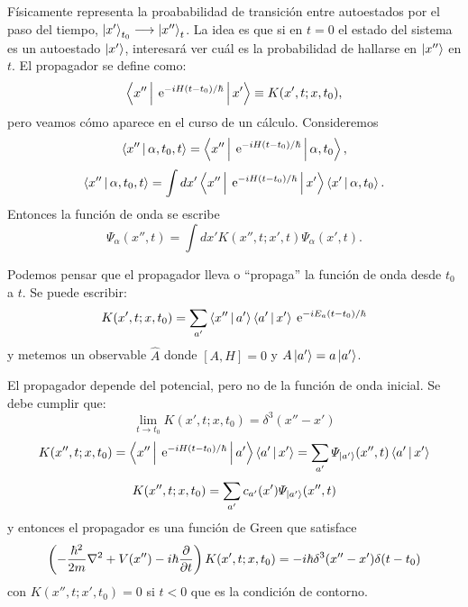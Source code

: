 \documentclass[10pt,oneside]{CBFT_book}
\begin{document}
Físicamente representa la proababilidad de transición entre autoestados por el paso del tiempo,
$ \Ket{x'}_{t_0} \longrightarrow \Ket{x''}_t$.
La idea es que si en $t=0$ el estado del sistema es un autoestado $\Ket{x'}$, interesará ver cuál
es la probabilidad de hallarse en $\Ket{x''}$ en $t$.
El propagador se define como:
\[
	\Braket{x''|\:\mathrm{e}^{-iH(t-t_0)/\hbar}|x'} \equiv K(x',t; x, t_0),
\]
pero veamos cómo aparece en el curso de un cálculo.
Consideremos
\[
	\Braket{x''| \alpha,t_0,t} = 
	\Braket{x''|\:\mathrm{e}^{-iH(t-t_0)/\hbar}|\alpha,t_0},
\]
\[
	\Braket{x''| \alpha,t_0,t} = 
	\int dx' \Braket{x''|\:\mathrm{e}^{-iH(t-t_0)/\hbar}|x'}\Braket{x'|\alpha,t_0}.
\]
Entonces la función de onda se escribe
\[
	\Psi_{\alpha}(x'',t) = \int dx' K(x'',t; x',t) \Psi_{\alpha}(x',t).
\]

Podemos pensar que el propagador lleva o ``propaga'' la función de onda desde $t_0$ a $t$. 
Se puede escribir:
\[
	K(x',t; x, t_0) = \sum_{a'} \Braket{x''|a'} \Braket{a'|x'} \:\mathrm{e}^{-iE_a(t-t_0)/\hbar}
\]
y metemos un observable $\hat{A}$ donde $[A,H]=0$ y $A\Ket{a'}=a\Ket{a'}$.

El propagador depende del potencial, pero no de la función de onda inicial. Se debe cumplir que:
\[
	\lim_{t\to t_0} K(x',t; x, t_0) = \delta^3(x''-x')
\]
\[
	K(x'',t; x, t_0) = \Braket{x''|\:\mathrm{e}^{-iH(t-t_0)/\hbar}|a'} \Braket{a'|x'} =
		\sum_{a'} \Psi_{\Ket{a'}}(x'',t)\Braket{a'|x'}
\]
\[
	K(x'',t; x, t_0) = \sum_{a'} c_{a'}(x')\Psi_{\Ket{a'}}(x'',t)
\]
y entonces el propagador es una función de Green que satisface 
\[
	\left( -\frac{\hbar^2}{2m}\nabla^2 +V(x'') - i\hbar\frac{\partial^{\hspace{-0.05em}} {}}{\partial {t}^{\hspace{-0.05em}}} \right)K(x',t; x, t_0) =
		- i\hbar \delta^3(x''-x') \delta(t-t_0)
\]
con $K(x'',t;x',t_0)=0 $ si $t<0$ que es la condición de contorno.
\end{document}
